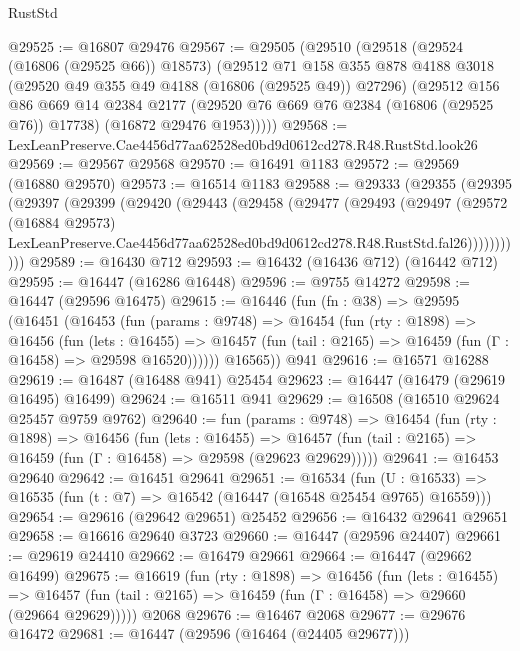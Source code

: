 \begin{lexlean}{RustStd}
\begin{coremodule}
@29525 := @16807 @29476
@29567 := @29505
    (@29510
      (@29518
        (@29524 (@16806 (@29525 @66)) @18573)
        (@29512
          @71
          @158
          @355
          @878
          @4188
          @3018
          (@29520 @49 @355 @49 @4188 (@16806 (@29525 @49)) @27296)
          (@29512
            @156
            @86
            @669
            @14
            @2384
            @2177
            (@29520 @76 @669 @76 @2384 (@16806 (@29525 @76)) @17738)
            (@16872 @29476 @1953)))))
@29568 := LexLeanPreserve.Cae4456d77aa62528ed0bd9d0612cd278.R48.RustStd.look26
@29569 := @29567 @29568
@29570 := @16491 @1183
@29572 := @29569 (@16880 @29570)
@29573 := @16514 @1183
@29588 := @29333
    (@29355
      (@29395
        (@29397
          (@29399
            (@29420
              (@29443
                (@29458
                  (@29477
                    (@29493
                      (@29497
                        (@29572
                          (@16884 @29573)
                          LexLeanPreserve.Cae4456d77aa62528ed0bd9d0612cd278.R48.RustStd.fal26)))))))))))
@29589 := @16430 @712
@29593 := @16432 (@16436 @712) (@16442 @712)
@29595 := @16447 (@16286 @16448)
@29596 := @9755 @14272
@29598 := @16447 (@29596 @16475)
@29615 := @16446
    (fun (fn : @38) =>
    @29595
      (@16451
        (@16453
          (fun (params : @9748) =>
          @16454
            (fun (rty : @1898) =>
            @16456
              (fun (lets : @16455) =>
              @16457 (fun (tail : @2165) => @16459 (fun (Γ : @16458) => @29598 @16520))))))
        @16565))
    @941
@29616 := @16571 @16288
@29619 := @16487 (@16488 @941) @25454
@29623 := @16447 (@16479 (@29619 @16495) @16499)
@29624 := @16511 @941
@29629 := @16508 (@16510 @29624 @25457 @9759 @9762)
@29640 := fun (params : @9748) =>
  @16454
    (fun (rty : @1898) =>
    @16456
      (fun (lets : @16455) =>
      @16457 (fun (tail : @2165) => @16459 (fun (Γ : @16458) => @29598 (@29623 @29629)))))
@29641 := @16453 @29640
@29642 := @16451 @29641
@29651 := @16534
    (fun (U : @16533) => @16535 (fun (t : @7) => @16542 (@16447 (@16548 @25454 @9765) @16559)))
@29654 := @29616 (@29642 @29651) @25452
@29656 := @16432 @29641 @29651
@29658 := @16616 @29640 @3723
@29660 := @16447 (@29596 @24407)
@29661 := @29619 @24410
@29662 := @16479 @29661
@29664 := @16447 (@29662 @16499)
@29675 := @16619
    (fun (rty : @1898) =>
    @16456
      (fun (lets : @16455) =>
      @16457 (fun (tail : @2165) => @16459 (fun (Γ : @16458) => @29660 (@29664 @29629)))))
    @2068
@29676 := @16467 @2068
@29677 := @29676 @16472
@29681 := @16447 (@29596 (@16464 (@24405 @29677)))

\end{coremodule}
\end{lexlean}
